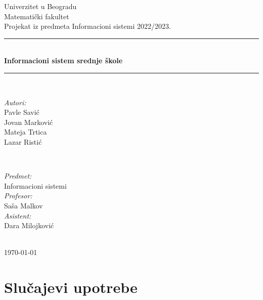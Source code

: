 \documentclass{article}
\begin{document}
\begin{titlepage}
    \centering

    \newcommand{\HRule}{\rule{\linewidth}{0.5mm}}
    \center
    \textup{\Large Univerzitet u Beogradu\\Matematički fakultet}\\[1.5cm]
    \textup{\Large Projekat iz predmeta Informacioni sistemi 2022/2023.}\\[0.4cm]

    \HRule \\[0.4cm]
    { \huge \bfseries Informacioni sistem srednje škole}\\[0.4cm]
    \HRule \\[1.1cm]
    
    \vspace{6 cm}
	
	\begin{minipage}{0.4\textwidth}
		\begin{flushleft} \large
			\emph{Autori:}\\
			Pavle Savić\\
			Jovan Marković\\
			Mateja Trtica\\
			Lazar Ristić\\		
		\end{flushleft}
	\end{minipage}
	~
	\begin{minipage}{0.5\textwidth}
		\begin{flushright} \large
			\emph{Predmet:}\\ 
			Informacioni sistemi\\
			\emph{Profesor:}\\ 
			Saša Malkov\\
			\emph{Asistent:}\\ 
			Dara Milojković
		\end{flushright}
	\end{minipage}\\[2cm]
	{\large \today}\\[2cm]
\end{titlepage}

\thispagestyle{empty}

\newpage
\renewcommand*\contentsname{Sadržaj:}
\tableofcontents

\newpage
\section{Slučajevi upotrebe}
\end{document}
